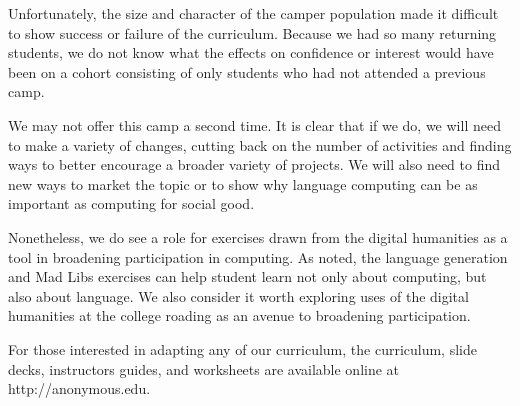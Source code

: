 Unfortunately, the size and character of the camper population made
it difficult to show success or failure of the curriculum.  Because
we had so many returning students, we do not know what the effects
on confidence or interest would have been on a cohort consisting
of only students who had not attended a previous camp.

We may not offer this camp a second time.  It is clear that if we
do, we will need to make a variety of changes, cutting back on the
number of activities and finding ways to better encourage a broader
variety of projects.  We will also need to find new ways to market
the topic or to show why language computing can be as important as
computing for social good.

Nonetheless, we do see a role for exercises drawn from the digital
humanities as a tool in broadening participation in computing.  As
noted, the language generation and Mad Libs exercises can help
student learn not only about computing, but also about language.
We also consider it worth exploring uses of the digital humanities
at the college roading as an avenue to broadening participation.

For those interested in adapting any of our curriculum, the curriculum,
slide decks, instructors guides, and worksheets are available online
at http://anonymous.edu.
